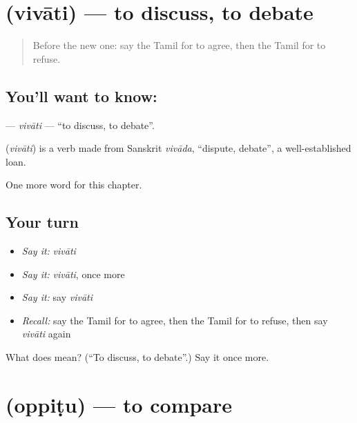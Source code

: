 \section[\texorpdfstring{\ta{விவாதி} (vivāti)}{விவாதி (vivāti)}]{ (vivāti) — to discuss, to debate}

\label{lesson:TA-C199-vivati}



\begin{quote}
Before the new one: say the Tamil for to agree, then the Tamil for to refuse.
\end{quote}

\subsection*{You'll want to know: }
\textbf{} — \emph{vivāti} — \textquotedblleft{}to discuss, to debate\textquotedblright{}.

\begin{cousinweb}
\textbf{} (\emph{vivāti}) is a verb made from Sanskrit \emph{vivāda}, \textquotedblleft{}dispute, debate\textquotedblright{}, a well-established loan.
\end{cousinweb}

\begin{grammarlens}[title={What you've built}]
One more word for this chapter.
\end{grammarlens}

\subsection*{Your turn}
\begin{itemize}
\raggedright
  \item \emph{Say it:} \emph{vivāti}
  \item \emph{Say it:} \emph{vivāti}, once more
  \item \emph{Say it:} say \emph{vivāti}
  \item \emph{Recall:} say the Tamil for to agree, then the Tamil for to refuse, then say \emph{vivāti} again
\end{itemize}

\begin{tcolorbox}[breakable,colback=teal!4,colframe=teal!35!black,title={Before you move on}]
What does  mean? (\textquotedblleft{}To discuss, to debate\textquotedblright{}.) Say it once more.
\end{tcolorbox}
\section[\texorpdfstring{\ta{ஒப்பிடு} (oppiṭu)}{ஒப்பிடு (oppiṭu)}]{ (oppiṭu) — to compare}

